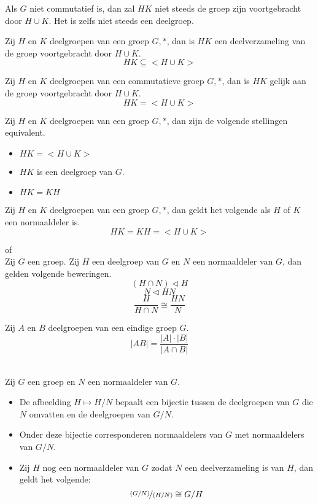 \documentclass[main.tex]{subfiles}
\begin{document}
\begin{opm}
Als $G$ niet commutatief is, dan zal $HK$ niet steeds de groep zijn voortgebracht door $H\cup K$.
Het is zelfs niet steeds een deelgroep.
\end{opm}

\begin{st}
Zij $H$ en $K$ deelgroepen van een groep $G,*$, dan is $HK$ een deelverzameling van de groep voortgebracht door $H\cup K$.
\[ HK \subseteq <H\cup K> \]
\end{st}

\begin{st}
Zij $H$ en $K$ deelgroepen van een commutatieve groep $G,*$, dan is $HK$ gelijk aan de groep voortgebracht door $H\cup K$.
\[ HK = <H\cup K> \]
\end{st}

\begin{pr}
Zij $H$ en $K$ deelgroepen van een groep $G,*$, dan zijn de volgende stellingen equivalent.
\begin{itemize}
\item $HK = <H\cup K>$
\item $HK$ is een deelgroep van $G$.
\item $HK = KH$
\end{itemize}
\end{pr}

\begin{gev}
Zij $H$ en $K$ deelgroepen van een groep $G,*$, dan geldt het volgende als $H$ of $K$ een normaaldeler is.
\[ HK = KH = <H\cup K> \]
\end{gev}

\begin{st}
 of \\
Zij $G$ een groep. Zij $H$ een deelgroep van $G$ en $N$ een normaaldeler van $G$, dan gelden volgende beweringen.
\[ (H \cap N) \triangleleft H \]
\[ N \triangleleft HN \]
\[ \frac{H}{H\cap N} \cong \frac{HN}{N} \]
\end{st}

\begin{st}
Zij $A$ en $B$ deelgroepen van een eindige groep $G$.
\[ |AB| = \frac{|A|\cdot|B|}{|A\cap B|} \]
\end{st}

\begin{st}
\\
Zij $G$ een groep en $N$ een normaaldeler van $G$.
\begin{itemize}
\item De afbeelding $H \mapsto H/N$ bepaalt een bijectie tussen de deelgroepen van $G$ die $N$ omvatten en de deelgroepen van $G/N$.
\item Onder deze bijectie corresponderen normaaldelers van $G$ met normaaldelers van $G/N$.
\item Zij $H$ nog een normaaldeler van $G$ zodat $N$ een deelverzameling is van $H$, dan geldt het volgende:
\[ \nicefrac{(G/N)}{(H/N)} \cong G/H\]
\end{itemize}
\end{st}
\end{document}
